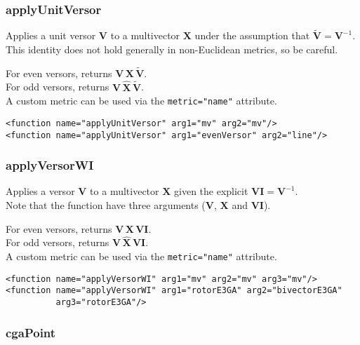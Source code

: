 \documentclass[10pt, a4paper]{article}
\newcommand{\gav}[1]{\ensuremath{\mathbf{#1}}}
\newcommand{\gp}{\,}
\newcommand{\inv}[1]{{#1}^{-1}}
\newcommand{\rev}[1]{\widetilde{#1}}
\begin{document}
\subsubsection*{applyUnitVersor}

Applies a unit versor \gav{V} to a multivector \gav{X} under the assumption
that $\rev{\gav{V}} = \inv{\gav{V}}$. This identity does not hold generally 
in non-Euclidean metrics, so be careful.

\noindent For even versors, returns $\gav{V} \gp \gav{X} \gp \rev{\gav{V}}$.\\
For odd versors, returns $\gav{V} \gp \hat{\gav{X}} \gp \rev{\gav{V}}$.\\

\noindent A custom metric can be used via the {\tt metric="name"} attribute.
\begin{verbatim}
<function name="applyUnitVersor" arg1="mv" arg2="mv"/>
<function name="applyUnitVersor" arg1="evenVersor" arg2="line"/>
\end{verbatim}

\subsubsection*{applyVersorWI}

Applies a versor \gav{V} to a multivector \gav{X} given the explicit $\gav{VI} = \inv{\gav{V}}$.\\
Note that the function have three arguments (\gav{V}, \gav{X} and \gav{VI}).

\noindent For even versors, returns $\gav{V} \gp \gav{X} \gp \gav{VI}$.\\
For odd versors, returns $\gav{V} \gp \hat{\gav{X}} \gp \gav{VI}$.\\

\noindent A custom metric can be used via the {\tt metric="name"} attribute.
\begin{verbatim}
<function name="applyVersorWI" arg1="mv" arg2="mv" arg3="mv"/>
<function name="applyVersorWI" arg1="rotorE3GA" arg2="bivectorE3GA" 
          arg3="rotorE3GA"/>
\end{verbatim}

\subsubsection*{cgaPoint}
\end{document}
